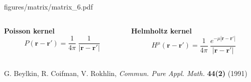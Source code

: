 \begin{frame}
\begin{columns}
\begin{column}[b]{0.5\linewidth}
\begin{center}
{    {figures/matrix/matrix_6.pdf}
    }
    \vspace{5mm}
    \end{center}
    \end{column}
    \end{columns}
    \vspace{5mm}

    \begin{columns}
    \begin{column}{.48\textwidth}
    \centering
    \textbf{Poisson kernel}
    \begin{equation}
	\nonumber
	P(\boldsymbol{r}-\boldsymbol{r}') = 
	    \frac{1}{4\pi}\ \frac{1}{|\boldsymbol{r}-\boldsymbol{r}'|}
    \end{equation}
    \end{column}
    \begin{column}{.48\textwidth}
    \centering
    \textbf{Helmholtz kernel}
    \begin{equation}
	\nonumber
	H^{\mu}(\boldsymbol{r}-\boldsymbol{r}') = \frac{1}{4\pi}\ 
	\frac{e^{-\mu |\boldsymbol{r}-\boldsymbol{r}'|}}
        {|\boldsymbol{r}-\boldsymbol{r}'|}
    \end{equation}
    \end{column}
    \end{columns}    
    \centering
    \vspace{8mm}
    \tiny
    G. Beylkin, R. Coifman, V. Rokhlin, 
    {\it Commun. Pure Appl. Math.}
    \textbf{44(2)}
    (1991)
\end{frame}

